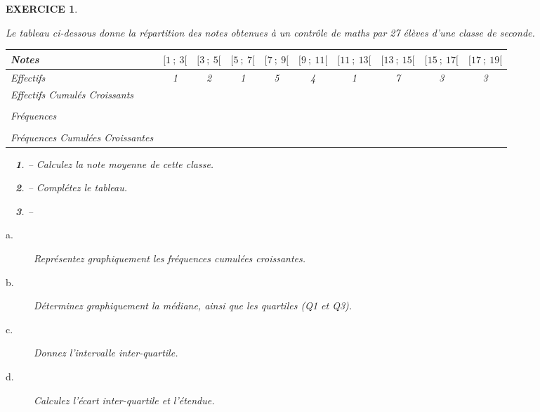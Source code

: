 \documentclass[a4paper]{article}   %
\renewcommand{\(}{\left(}
\renewcommand{\)}{\right)}
\newtheorem{ques}{~}
\newenvironment{qu}{\begin{ques}--} {\end{ques}}
\newtheorem{EXO}{\large EXERCICE }
\newenvironment{EX}   { \setcounter{ques}{0} \begin{EXO} \hrulefill ~\vspace{0.3cm}

\normalfont}    {\end{EXO} \medskip}
\begin{document}
\newpage
\setcounter{ques}{0}
\begin{EX}
Le tableau ci-dessous donne la répartition des notes obtenues à un contrôle de maths par 27 élèves d'une classe de seconde.
\begin{center}
\begin{tabular}{|p{2.1cm}|c|c|c|c|c|c|c|c|c|}		%
\hline							%
Notes & $[1~;~3[$&$[3~;~5[$&$[5~;~7[$&$[7~;~9[$&$[9~;~11[$&$[11~;~13[$&$[13~;~15[$&$[15~;~17[$&$[17~;~19[$ \\
\hline
Effectifs&1&2&1&5&4&1&7&3&3\\
\hline
Effectifs Cumulés Croissants &&&&&&&&& \\
\hline
&&&&&&&&&\\
Fréquences&&&&&&&&&\\
&&&&&&&&&\\
\hline
 Fréquences Cumulées Croissantes&&&&&&&&&\\
\hline
\end{tabular}
\end{center}

\begin{qu} Calculez la note moyenne de cette classe.
\end{qu}

\begin{qu} Complétez le tableau.
\end{qu}

\begin{qu}
\begin{description}
\item [a.] Représentez graphiquement les fréquences cumulées croissantes.
\item [b.] Déterminez graphiquement la médiane, ainsi que les quartiles (Q1 et Q3).
\item [c.] Donnez l'intervalle inter-quartile.
\item [d.] Calculez l'écart inter-quartile et l'étendue.
\end{description}
\end{qu}
\end{EX}
\end{document}
